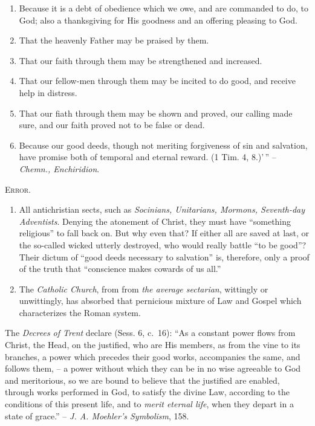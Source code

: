 \documentclass[
]{book}
\begin{document}
\begin{enumerate}
\def\labelenumi{\arabic{enumi}.}
\item
  Because it is a debt of obedience which we owe, and are commanded to do, to God; also a thanksgiving for His goodness and an offering pleasing to God.
\item
  That the heavenly Father may be praised by them.
\item
  That our faith through them may be strengthened and increased.
\item
  That our fellow-men through them may be incited to do good, and receive help in distress.
\item
  That our fiath through them may be shown and proved, our calling made sure, and our faith proved not to be false or dead.
\item
  Because our good deeds, though not meriting forgiveness of sin and salvation, have promise both of temporal and eternal reward. (1 Tim. 4, 8.)'\,'' -- \emph{Chemn., Enchiridion}.
\end{enumerate}

\begin{center}
\textsc{Error.}
\end{center}

\begin{enumerate}
\def\labelenumi{\arabic{enumi}.}
\item
  All antichristian sects, such as \emph{Socinians, Unitarians, Mormons, Seventh-day Adventists}. Denying the atonement of Christ, they must have ``something religious'' to fall back on. But why even that? If either all are saved at last, or the so-called wicked utterly destroyed, who would really battle ``to be good''? Their dictum of ``good deeds necessary to salvation'' is, therefore, only a proof of the truth that ``conscience makes cowards of us all.''
\item
  The \emph{Catholic Church}, from from \emph{the average sectarian}, wittingly or unwittingly, has absorbed that pernicious mixture of Law and Gospel which characterizes the Roman system.
\end{enumerate}

The \emph{Decrees of Trent} declare (Sess. 6, c.~16): ``As a constant power flows from Christ, the Head, on the justified, who are His members, as from the vine to its branches, a power which precedes their good works, accompanies the same, and follows them, -- a power without which they can be in no wise agreeable to God and meritorious, so we are bound to believe that the justified are enabled, through works performed in God, to satisfy the divine Law, according to the conditions of this present life, and to \emph{merit eternal life}, when they depart in a state of grace.'' -- \emph{J. A. Moehler's Symbolism}, 158.
\end{document}
